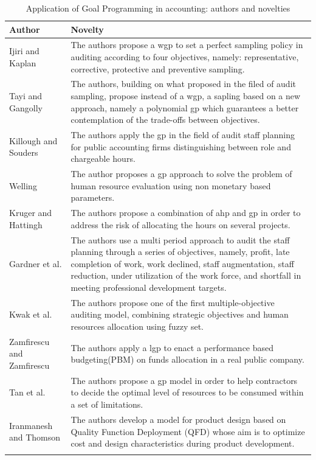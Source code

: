 \begin{doublespace}
\begin{center}
\begin{longtable}{ || m{11em} m{20em}|| }
 \hline
 Author & Novelty \\ 
\hline\hline
Ijiri and Kaplan\cite{Ijiri1971} & The authors propose a \gls{wgp} to set a perfect sampling policy in auditing according to four objectives, namely: representative, corrective, protective and preventive sampling. \\
\hline
Tayi and Gangolly\cite{Tayi1985} & The authors, building on what proposed in the filed of audit sampling, propose instead of a \gls{wgp}, a sapling based on a new approach, namely a polynomial \gls{gp} which guarantees a better contemplation of the trade-offs between objectives. \\
\hline
Killough and Souders\cite{Killough1973} & The authors apply the \gls{gp} in the field of audit staff planning for public accounting firms distinguishing between role and chargeable hours. \\
\hline
Welling\cite{Welling1977} & The author proposes a \gls{gp} approach to solve the problem of human resource evaluation using non monetary based parameters. \\
\hline
Kruger and Hattingh\cite{Kruger2006} & The authors propose a combination of \gls{ahp} and \gls{gp} in order to address the risk of allocating the hours on several projects. \\
\hline
Gardner et al.\cite{Gardner1990} & The authors use a multi period approach to audit the staff planning through a series of objectives, namely, profit, late completion of work, work declined, staff augmentation, staff reduction, under utilization of the work force, and shortfall in meeting professional development targets. \\
\hline
Kwak et al.\cite{Kwak2003} & The authors propose one of the first multiple-objective auditing model, combining strategic objectives and human resources allocation using fuzzy set. \\
\hline
Zamfirescu and Zamfirescu\cite{Zamfirescu2013} & The authors apply a \gls{lgp} to enact a performance based budgeting(PBM) on funds allocation in a real public company. \\
\w
Tan et al.\cite{Tan2008} & The authors propose a \gls{gp} model in order to help contractors to decide the optimal level of resources to be consumed within a set of limitations.  \\
\hline 
Iranmanesh and Thomson\cite{Iranmanesh2008} & The authors develop a model for product design based
on Quality Function Deployment (QFD) whose aim is to optimize cost and design characteristics during product
development. \\
 \hline
 \caption{Application of Goal Programming in accounting: authors and novelties}
 \end{longtable}
\end{center}


\end{doublespace}

